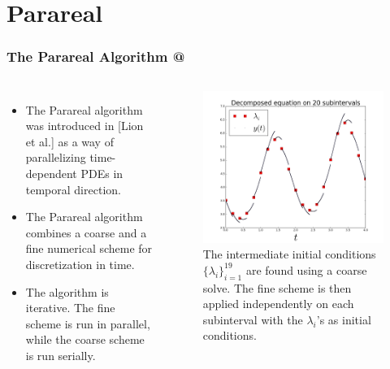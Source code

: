 \documentclass[9pt]{beamer}
\makeatletter
\newcommand*{\rom}[1]{\expandafter\@slowromancap\romannumeral #1@}
\makeatother
\begin{document}
\section{Parareal}
\begin{frame}
\frametitle{The Parareal Algorithm \rom{1}}
\begin{columns}
\begin{itemize}
\item{The Parareal algorithm was introduced in [Lion et al.] as a way of parallelizing time-dependent PDEs in temporal direction.}
\item{The Parareal algorithm combines a coarse and a fine numerical scheme for discretization in time.}
\item{The algorithm is iterative. The fine scheme is run in parallel, while the coarse scheme is run serially.}
\end{itemize}
\begin{figure}
\includegraphics[scale=0.2]{parareal.png}
\caption{{\small 
The intermediate initial conditions $\{\lambda_i\}_{i=1}^{19}$ are found using a coarse solve. The fine scheme is then applied independently on each subinterval with the $\lambda_i$'s as initial conditions.
}}
\end{figure}
\end{columns}
\end{frame}
\end{document}
